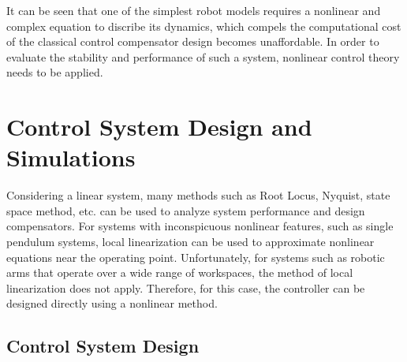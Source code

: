 \documentclass[a4paper]{article}
\begin{document}
It can be seen that one of the simplest robot models requires a nonlinear and complex equation to discribe its dynamics, which compels the computational cost of the classical control compensator design becomes unaffordable. In order to evaluate the stability and performance of such a system, nonlinear control theory needs to be applied. 



\section{Control System Design and Simulations}

Considering a linear system, many methods such as Root Locus, Nyquist, state space method, etc. can be used to analyze system performance and design compensators. For systems with inconspicuous nonlinear features, such as single pendulum systems, local linearization can be used to approximate nonlinear equations near the operating point. Unfortunately, for systems such as robotic arms that operate over a wide range of workspaces, the method of local linearization does not apply. Therefore, for this case, the controller can be designed directly using a nonlinear method. 

\subsection{Control System Design}
\end{document}
